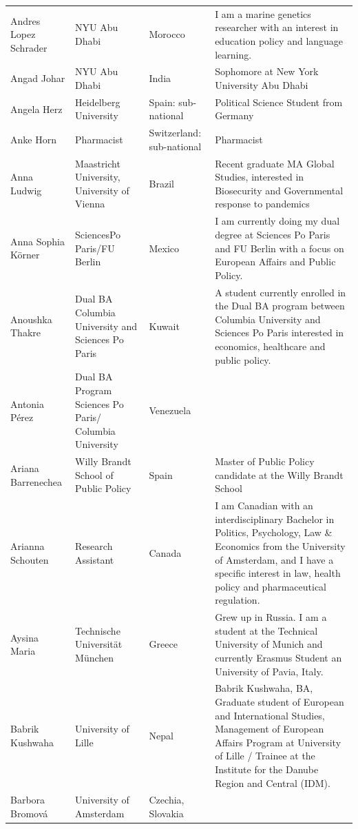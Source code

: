 \documentclass[]{article}
\begin{document}
\begin{longtable}{l>{\raggedright\arraybackslash}p{2cm}>{\raggedright\arraybackslash}p{2cm}>{\raggedright\arraybackslash}p{3cm}}
Andres Lopez Schrader & NYU Abu Dhabi & Morocco & I am a marine genetics researcher with an interest in education policy and language learning.\\
\addlinespace
\rowcolor{gray!6}  Angad Johar & NYU Abu Dhabi & India & Sophomore at New York University Abu Dhabi\\
Angela Herz & Heidelberg University & Spain: sub-national & Political Science Student from Germany\\
\rowcolor{gray!6}  Anke Horn & Pharmacist & Switzerland: sub-national & Pharmacist\\
Anna Ludwig & Maastricht University, University of Vienna & Brazil & Recent graduate MA Global Studies, interested in Biosecurity and Governmental response to pandemics\\
\rowcolor{gray!6}  Anna Sophia Körner & SciencesPo Paris/FU Berlin & Mexico & I am currently doing my dual degree at Sciences Po Paris and FU Berlin with a focus on European Affairs and Public Policy.\\
\addlinespace
Anoushka Thakre & Dual BA Columbia University and Sciences Po Paris & Kuwait & A student currently enrolled in the Dual BA program between Columbia University and Sciences Po Paris interested in economics, healthcare and public policy.\\
\rowcolor{gray!6}  Antonia Pérez & Dual BA Program Sciences Po Paris/ Columbia University & Venezuela & \\
Ariana Barrenechea & Willy Brandt School of Public Policy & Spain & Master of Public Policy candidate at the Willy Brandt School\\
\rowcolor{gray!6}  Arianna Schouten & Research Assistant & Canada & I am Canadian with an interdisciplinary Bachelor in Politics, Psychology, Law \& Economics from the University of Amsterdam, and I have a specific interest in law, health policy and pharmaceutical regulation.\\
Aysina Maria & Technische Universität München & Greece & Grew up in Russia. I am a student at the Technical University of Munich and currently Erasmus Student an University of Pavia, Italy.\\
\addlinespace
\rowcolor{gray!6}  Babrik Kushwaha & University of Lille & Nepal & Babrik Kushwaha, BA, Graduate student of European and International Studies, Management of European Affairs Program at University of Lille / Trainee at the Institute for the Danube Region and Central (IDM).\\
Barbora Bromová & University of Amsterdam & Czechia, Slovakia & \\

\end{longtable}
\end{document}
